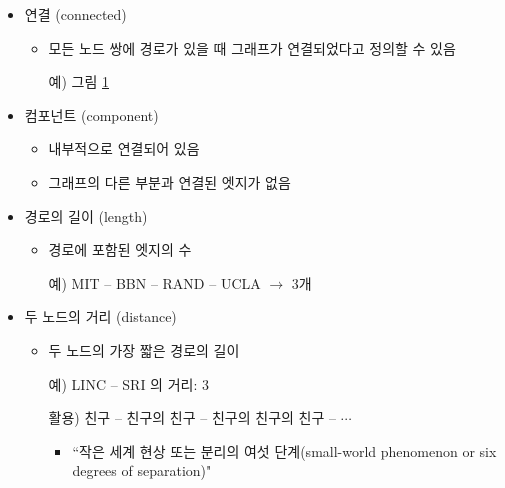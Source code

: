 \begin{itemize}
\begin{itemize}
\begin{figure}[htbp]
\begin{center}
			\label{fig:internetin1970}
			\end{center}
			\end{figure}
	\item 연결 (connected)
		\begin{itemize}
		\item 모든 노드 쌍에 경로가 있을 때 그래프가 연결되었다고 정의할 수 있음
		\item[예)] 그림 \ref{fig:internetin1970}
		\end{itemize}
	\item 컴포넌트 (component)
		\begin{itemize}
		\item 내부적으로 연결되어 있음
		\item 그래프의 다른 부분과 연결된 엣지가 없음
		\end{itemize}
	\item 경로의 길이 (length)
		\begin{itemize}
		\item 경로에 포함된 엣지의 수
		\item[예)] MIT -- BBN -- RAND -- UCLA $\rightarrow$ 3개
		\end{itemize}
	\item 두 노드의 거리 (distance)
		\begin{itemize}
		\item 두 노드의 가장 짧은 경로의 길이
		\item[예)] LINC -- SRI 의 거리: 3
		\item[활용)] 친구 -- 친구의 친구 -- 친구의 친구의 친구 -- $\cdots$
			\begin{itemize}
			\item ``작은 세계 현상 또는 분리의 여섯 단계(small-world phenomenon or six degrees of separation)"
			\end{itemize}
		\end{itemize}
	\end{itemize}		
\end{itemize}

